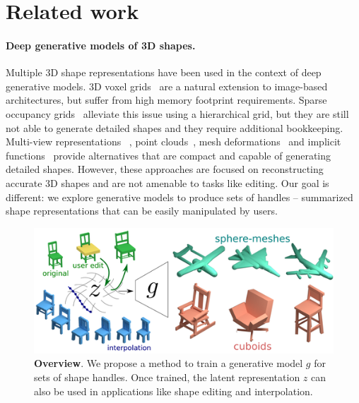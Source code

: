 \section{Related work}
\label{sec:related}

\paragraph{Deep generative models of 3D shapes.}
Multiple 3D shape representations have been used in the context of
deep generative models.
3D voxel grids~\cite{choy20163d, prgan} are a natural extension to image-based architectures,
but suffer from high memory footprint requirements.
Sparse occupancy grids~\cite{Wang-2017-ocnn, tatarchenko2017octree, hie3dcnn, matryoshka} alleviate this issue using a hierarchical grid,
but they are still not able to generate detailed shapes and they require additional bookkeeping.
Multi-view representations ~\cite{Soltani17, LunGKMW17}, point clouds~\cite{fan2016point, mrt18, pcagan, latentpc}, mesh deformations~\cite{pixel2mesh, cmrKanazawa18}
and implicit functions~\cite{park2019deepsdf, mescheder2019occupancy, chen2019learning, genova2019learning} provide alternatives that are compact and capable
of generating detailed shapes.
However, these approaches are focused on reconstructing accurate 3D shapes and
are not amenable to tasks like editing.
Our goal is different: we explore generative models to produce sets of handles --
summarized shape representations that can be easily manipulated by users.

\begin{figure}
\centering
\includegraphics[width=0.8\linewidth]{handles/imgs/pipeline.png}
\caption{\label{fig:handles}
\textbf{Overview}.
We propose a method to train a generative model $g$ for sets of shape handles.
Once trained, the latent representation $z$ can also be used in applications like
shape editing and interpolation.}
\vspace{-14pt}
\end{figure}


